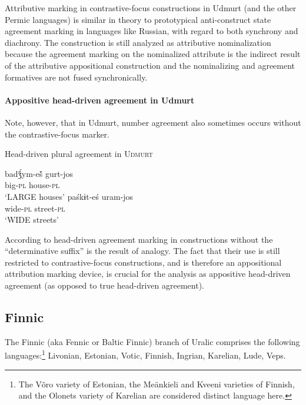 Attributive marking in contrastive-focus constructions in Udmurt (and the other Permic languages) is similar in theory to prototypical anti-construct state agreement marking in languages like Russian, with regard to both synchrony and diachrony. The construction is still analyzed as attributive nominalization because the agreement marking on the nominalized attribute is the indirect result of the attributive appositional construction and the nominalizing and agreement formatives are not fused synchronically.

\paragraph{Appositive head-driven agreement in Udmurt}
Note, however, that in Udmurt, number agreement also sometimes occurs without the contrastive-focus marker.
\begin{exe}
\ex Head-driven plural agreement in \textsc{Udmurt}
\begin{xlist}
\ex 
\gll	badǯ́ym-eš́ gurt-jos\\
	big-\textsc{pl} house-\textsc{pl}\\
\glt	‘LARGE houses’ \citep[40]{winkler2001}
\ex 
\gll	paśkɨt-eś uram-jos\\
	wide-\textsc{pl} street-\textsc{pl}\\
\glt	‘WIDE streets’  \citep[63]{csucs1990}
\end{xlist}
\end{exe}
According to \citet[63]{csucs1990} head-driven agreement marking in constructions without the “determinative suffix” is the result of analogy. The fact that their use is still restricted to contrastive-focus constructions, and is therefore an appositional attribution marking device, is crucial for the analysis as appositive head-driven agreement (as opposed to true head-driven agreement).

\subsection{Finnic}
The Finnic (aka Fennic or Baltic Finnic) branch of Uralic comprises the following languages:\footnote{The Võro variety of Estonian, the Meänkieli and Kveeni varieties of Finnish, and the Olonets variety of Karelian are considered distinct language here.} Livonian, Estonian, Votic, Finnish, Ingrian, Karelian, Lude, Veps.\\

